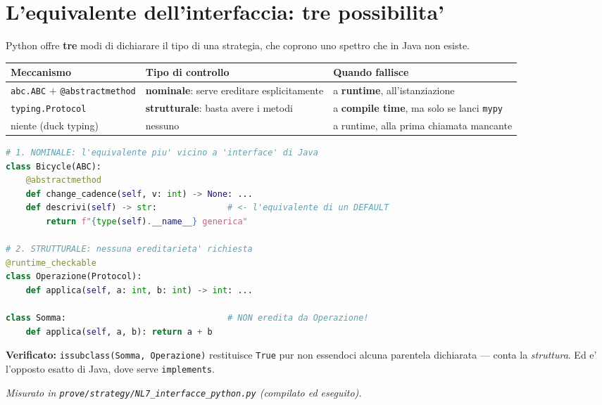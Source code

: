 \documentclass{report}
\newcommand{\code}[1]{\texttt{\small #1}}
\newcommand{\fonteprove}[1]{{\footnotesize\itshape\color{gray} Misurato in \code{prove/strategy/#1} (compilato ed eseguito).\par}}
\begin{document}
\section{L'equivalente dell'interfaccia: tre possibilita'}

Python offre \textbf{tre} modi di dichiarare il tipo di una strategia,
che coprono uno spettro che in Java non esiste.

\begin{center}
\renewcommand{\arraystretch}{1.35}
\footnotesize
\begin{tabular}{|>{\raggedright\arraybackslash}p{3.4cm}|>{\raggedright\arraybackslash}p{4.4cm}|>{\raggedright\arraybackslash}p{4.4cm}|}
\hline
\textbf{Meccanismo} & \textbf{Tipo di controllo} & \textbf{Quando fallisce} \\
\hline
\code{abc.ABC} $+$ \code{@abstractmethod} & \textbf{nominale}: serve ereditare esplicitamente & a \textbf{runtime}, all'istanziazione \\
\hline
\code{typing.Protocol} & \textbf{strutturale}: basta avere i metodi & a \textbf{compile time}, ma solo se lanci \code{mypy} \\
\hline
niente (duck typing) & nessuno & a runtime, alla prima chiamata mancante \\
\hline
\end{tabular}
\end{center}

\begin{lstlisting}[language=Python]
# 1. NOMINALE: l'equivalente piu' vicino a 'interface' di Java
class Bicycle(ABC):
    @abstractmethod
    def change_cadence(self, v: int) -> None: ...
    def descrivi(self) -> str:              # <- l'equivalente di un DEFAULT
        return f"{type(self).__name__} generica"

# 2. STRUTTURALE: nessuna ereditarieta' richiesta
@runtime_checkable
class Operazione(Protocol):
    def applica(self, a: int, b: int) -> int: ...

class Somma:                                # NON eredita da Operazione!
    def applica(self, a, b): return a + b
\end{lstlisting}

\textbf{Verificato:} \code{issubclass(Somma, Operazione)} restituisce
\code{True} pur non essendoci alcuna parentela dichiarata --- conta la
\emph{struttura}. Ed e' l'opposto esatto di Java, dove serve
\code{implements}.

\fonteprove{NL7\_interfacce\_python.py}
\end{document}

